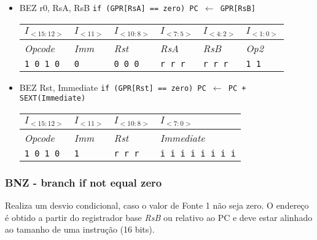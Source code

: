 \documentclass{extreport}
\begin{document}
\begin{itemize}
\item BEZ r0, RsA, RsB
\subitem \texttt{if (GPR[RsA] == zero) PC $\leftarrow$ GPR[RsB]}
\begin{table}[ht!]
\centering
\begin{tabular}{|p{1.6cm}|p{1.6cm}|p{1.6cm}|p{1.6cm}|p{1.6cm}|p{1.6cm}|}
\hline
$I_{<15:12>}$ & $I_{<11>}$ & $I_{<10:8>}$ & $I_{<7:5>}$ & $I_{<4:2>}$ & $I_{<1:0>}$ \\ \hline
\textit{Opcode} & \textit{Imm} & \textit{Rst} & \textit{RsA} & \textit{RsB} & \textit{Op2} \\ \hline
\texttt{1 0 1 0} & \texttt{0} & \texttt{0 0 0} & \texttt{r r r} & \texttt{r r r} & \texttt{1 1} \\ \hline
\end{tabular}
\end{table}

\item BEZ Rst, Immediate
\subitem \texttt{if (GPR[Rst] == zero) PC $\leftarrow$ PC + SEXT(Immediate)}
\begin{table}[ht!]
\centering
\begin{tabular}{|p{1.6cm}|p{1.6cm}|p{1.6cm}|p{5.65cm}|}
\hline
$I_{<15:12>}$ & $I_{<11>}$ & $I_{<10:8>}$ & $I_{<7:0>}$ \\ \hline
\textit{Opcode} & \textit{Imm} & \textit{Rst} & \textit{Immediate} \\ \hline
\texttt{1 0 1 0} & \texttt{1} & \texttt{r r r} & \texttt{i i i i i i i i} \\ \hline
\end{tabular}
\end{table}
\end{itemize}

\subsubsection{BNZ - branch if not equal zero}
Realiza um desvio condicional, caso o valor de Fonte 1 não seja zero. O endereço é obtido a partir do registrador base \textit{RsB} ou relativo ao PC e deve estar alinhado ao tamanho de uma instrução (16 bits).
\end{document}
